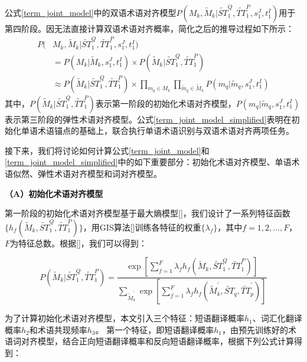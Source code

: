 公式\ref{term_joint_model}中的双语术语对齐模型$P(M_k, \widetilde{M}_k | \widetilde{ST}_1^Q, \widetilde{TT}_1^P, s_1^J, t_1^I) $用于第四阶段。因无法直接计算双语术语对齐概率，简化之后的推导过程如下所示：
\begin{equation}
\label{term_joint_model_simplified}
\begin{aligned} 
	P(&M_k, \widetilde{M}_k | \widetilde{ST}_1^Q, \widetilde{TT}_1^P, s_1^J, t_1^I) \\
	& = P(M_k | \widetilde{M}_k, s_1^J, t_1^I) \times P(\widetilde{M}_k | \widetilde{ST}_1^Q, \widetilde{TT}_1^P) \\
	& \approx P(\widetilde{M}_k | \widetilde{ST}_1^Q, \widetilde{TT}_1^P) \times \prod_{m_q \in M_k} \prod_{\widetilde{m}_q \in \widetilde{M}_k} P(m_q | \widetilde{m}_q, s_1^J, t_1^I) 
\end{aligned}
\end{equation}
其中，$P(\widetilde{M}_k | \widetilde{ST}_1^Q, \widetilde{TT}_1^P)$表示第一阶段的初始化术语对齐模型，$P(m_q | \widetilde{m}_q, s_1^J, t_1^I)$表示第三阶段的弹性术语对齐模型。公式\ref{term_joint_model_simplified}表明在初始化单语术语锚点的基础上，联合执行单语术语识别与双语术语对齐两项任务。

接下来，我们将讨论如何计算公式\ref{term_joint_model}和\ref{term_joint_model_simplified}中的如下重要部分：初始化术语对齐模型、单语术语似然、弹性术语对齐模型和词对齐模型。

\textbf{（A）初始化术语对齐模型}

第一阶段的初始化术语对齐模型基于最大熵模型[\cite{Chieu:2002}]，我们设计了一系列特征函数$\{h_f(\widetilde{M}_k, \widetilde{ST}_1^Q, \widetilde{TT}_1^P)\}$，用GIS算法[\cite{Darroch:1972}]训练各特征的权重$\{\lambda_f\}$，其中$f=1,2,\ldots,F$，$F$为特征总数。根据[\cite{Och:2002}]，我们可以得到：

\begin{equation}
P(\widetilde{M}_k | \widetilde{ST}_1^Q, \widetilde{TT}_1^P) = \frac{\exp \left[ \sum_{f=1}^{F} \lambda_f h_f(\widetilde{M}_k, \widetilde{ST}_1^Q, \widetilde{TT}_1^P) \right]}
{\sum_{\widetilde{M}_k^{'}} \exp \left[\sum_{f=1}^{F} \lambda_f h_f(\widetilde{M}_k^{'}, \widetilde{ST}_q, \widetilde{TT}_p^{'}) \right]}
\end{equation}

为了计算初始化术语对齐模型，本文引入三个特征：短语翻译概率$h_1$、词汇化翻译概率$h_2$和术语共现频率$h_3$。
第一个特征，即短语翻译概率$h_1$，由预先训练好的术语词对齐模型，结合正向短语翻译概率和反向短语翻译概率，根据下列公式计算得到：


